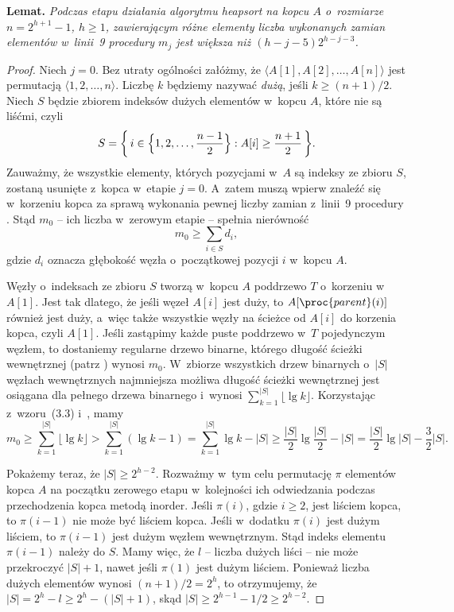 \medskip
\noindent\textsf{\textbf{Lemat.}} \textit{Podczas\/  etapu działania algorytmu heapsort na kopcu\/ $A$ o~rozmiarze\/ $n=2^{h+1}-1$,\/ $h\ge1$, zawierającym różne elementy liczba wykonanych zamian elementów w~linii~9 procedury \/ $m_j$ jest większa niż\/ $(h-j-5)2^{h-j-3}$.}
\begin{proof}
Niech $j=0$. Bez utraty ogólności załóżmy, że $\langle A[1],A[2],\dots,A[n]\rangle$ jest permutacją $\langle1,2,\dots,n\rangle$. Liczbę $k$ będziemy nazywać \emph{dużą}, jeśli $k\ge(n+1)/2$. Niech $S$ będzie zbiorem indeksów dużych elementów w~kopcu $A$, które nie są liśćmi, czyli
\[
    S = \biggl\{\,i\in\Bigl\{1,2,\dots,\frac{n-1}{2}\Bigr\}:A[i]\ge\frac{n+1}{2}\,\biggr\}.
\]
Zauważmy, że wszystkie elementy, których pozycjami w~$A$ są indeksy ze zbioru $S$, zostaną usunięte z~kopca w~etapie $j=0$. A~zatem muszą wpierw znaleźć się w~korzeniu kopca za sprawą wykonania pewnej liczby zamian z~linii~9 procedury . Stąd $m_0$ -- ich liczba w~zerowym etapie -- spełnia nierówność
\[
    m_0 \ge \sum_{i\in S}d_i,
\]
gdzie $d_i$ oznacza głębokość węzła o~początkowej pozycji $i$ w~kopcu $A$.

Węzły o~indeksach ze zbioru $S$ tworzą w~kopcu $A$ poddrzewo $T$ o~korzeniu w~$A[1]$. Jest tak dlatego, że jeśli węzeł $A[i]$ jest duży, to $A[\proc{parent}(i)]$ również jest duży, a~więc także wszystkie węzły na ścieżce od $A[i]$ do korzenia kopca, czyli $A[1]$. Jeśli zastąpimy każde puste poddrzewo w~$T$ pojedynczym węzłem, to dostaniemy regularne drzewo binarne, którego długość ścieżki wewnętrznej (patrz ) wynosi $m_0$. W~zbiorze wszystkich drzew binarnych o~$|S|$ węzłach wewnętrznych najmniejsza możliwa długość ścieżki wewnętrznej jest osiągana dla pełnego drzewa binarnego i~wynosi $\sum_{k=1}^{|S|}\lfloor\lg k\rfloor$. Korzystając z~wzoru~(3.3) i~, mamy
\[
    m_0 \ge \sum_{k=1}^{|S|}\lfloor\lg k\rfloor > \sum_{k=1}^{|S|}(\lg k-1) = \sum_{k=1}^{|S|}\lg k-|S| \ge \frac{|S|}{2}\lg\frac{|S|}{2}-|S| = \frac{|S|}{2}\lg|S|-\frac{3}{2}|S|.
\]

Pokażemy teraz, że $|S|\ge2^{h-2}$. Rozważmy w~tym celu permutację $\pi$ elementów kopca $A$ na początku zerowego etapu w~kolejności ich odwiedzania podczas przechodzenia kopca metodą inorder. Jeśli $\pi(i)$, gdzie $i\ge2$, jest liściem kopca, to $\pi(i-1)$ nie może być liściem kopca. Jeśli w~dodatku $\pi(i)$ jest dużym liściem, to $\pi(i-1)$ jest dużym węzłem wewnętrznym. Stąd indeks elementu $\pi(i-1)$ należy do $S$. Mamy więc, że $l$ -- liczba dużych liści -- nie może przekroczyć $|S|+1$, nawet jeśli $\pi(1)$ jest dużym liściem. Ponieważ liczba dużych elementów wynosi $(n+1)/2=2^h$, to otrzymujemy, że $|S|=2^h-l\ge2^h-(|S|+1)$, skąd $|S|\ge2^{h-1}-1/2\ge2^{h-2}$.


\end{proof}
